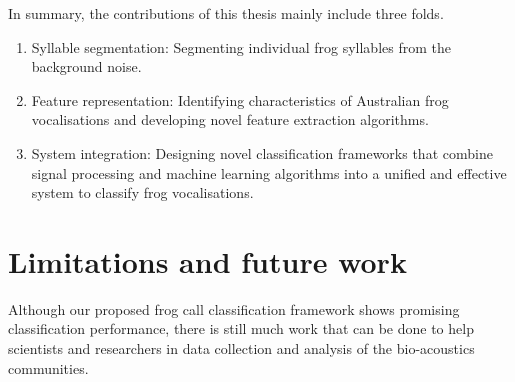 In summary, the contributions of this thesis mainly include three folds.

\begin{enumerate}
\item Syllable segmentation: Segmenting individual frog syllables from the background noise.

\item Feature representation: Identifying characteristics of Australian frog vocalisations and developing novel feature extraction algorithms.

\item System integration: Designing novel classification frameworks that combine signal processing and machine learning algorithms into a unified and effective system to classify frog vocalisations.

\end{enumerate}






\section{Limitations and future work}
Although our proposed frog call classification framework shows promising classification performance, there is still much work that can be done to help scientists and researchers in data collection and analysis of the bio-acoustics communities.


